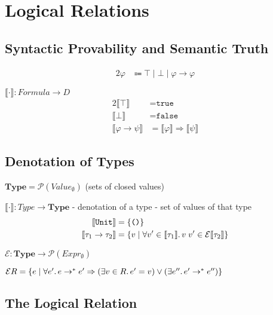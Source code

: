 \chapter{Logical Relations}

\section{Syntactic Provability and Semantic Truth}


\newcommand\Denot[1]{\llbracket#1\rrbracket}
\begin{alignat*}{2}
  \varphi & \Coloneqq \top \mid \bot \mid \varphi \to \varphi
\end{alignat*}

$\Denot{\cdot} \colon Formula \to D$
\begin{alignat*}{2}
  \Denot{\top} & = \texttt{true} \\
  \Denot{\bot} & = \texttt{false} \\
  \Denot{\varphi \to \psi} & = \Denot{\varphi} \Rightarrow \Denot{\psi}
\end{alignat*}

\section{Denotation of Types}

$\textbf{Type} = \mathcal{P}(Value_{\emptyset})$ (sets of closed values)

$\Denot{\cdot} \colon Type \to \textbf{Type}$ - denotation of a type - set of values of that type
\begin{alignat*}{2}
  \Denot{\texttt{Unit}} & = \{\texttt{()}\} \\
  \Denot{\tau_1 \to \tau_2} & = \{ v \mid \forall v' \in \Denot{\tau_1}\ldotp v\;v' \in \mathcal{E}\Denot{\tau_2} \}
\end{alignat*}

$\mathcal{E} \colon \textbf{Type} \to \mathcal{P}(Expr_{\emptyset})$

$\mathcal{E}R = \{ e \mid \forall e'\ldotp e \to^* e' \Rightarrow (\exists v \in R \ldotp e'=v) \lor (\exists e'' \ldotp e'\to^*e'') \}$

\section{The Logical Relation}

